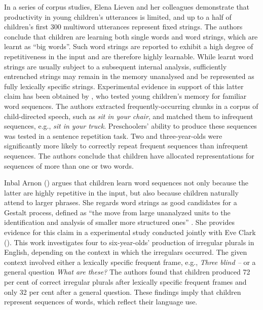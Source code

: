 In a series of corpus studies, Elena Lieven and her colleagues \citep{lieven-pine-baldwin-1997,dabrowska-lieven-2005,lieven-salomo-tomasello-2009} demonstrate that productivity in young children's utterances is limited, and up to a half of children's first 300 multiword utterances represent fixed strings. The authors conclude that children are learning both single words and word strings, which are learnt as ``big words''. Such word strings are reported to exhibit a high degree of repetitiveness in the input and are therefore highly learnable. While learnt word strings are usually subject to a subsequent internal analysis, sufficiently entrenched strings may remain in the memory unanalysed and be represented as fully lexically specific strings. Experimental evidence in support of this latter claim has been obtained by \citet{bannard-matthews-2008}, who tested young children's memory for familiar word sequences. The authors extracted frequently-occurring chunks in a corpus of child-directed speech, such as \textit{sit in your chair}, and matched them to infrequent sequences, e.g., \textit{sit in your truck}. Preschoolers' ability to produce these sequences was tested in a sentence repetition task. Two and three-year-olds were significantly more likely to correctly repeat frequent sequences than infrequent sequences. The authors conclude that children have allocated representations for sequences of more than one or two words. 

Inbal Arnon (\citeyear{arnon-2011}) argues that children learn word sequences not only because the latter are highly repetitive in the input, but also because children naturally attend to larger phrases. She regards word strings as good candidates for a Gestalt process, defined as ``the move from large unanalyzed units to the identification and analysis of smaller more structured ones'' \citep[][167]{arnon-2011}. She provides evidence for this claim in a experimental study conducted jointly with Eve Clark (\citeyear{arnon-clark-2011}). This work investigates four to six-year-olds' production of irregular plurals in English, depending on the context in which the irregulars occurred. The given context involved either a lexically specific frequent frame, e.g., \textit{Three blind  -- } or a general question \textit{What are these?} The authors found that children produced 72 per cent of correct irregular plurals after lexically specific frequent frames and only 32 per cent after a general question. These findings imply that children represent sequences of words, which reflect their language use.

